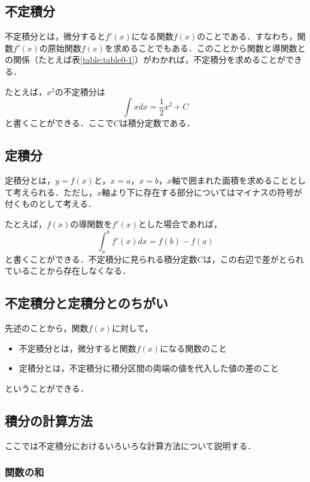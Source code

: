 \subsection{不定積分}

不定積分とは，微分すると$f'(x)$になる関数$f(x)$のことである．すなわち，関数$f'(x)$の原始関数$f(x)$を求めることでもある．このことから関数と導関数との関係（たとえば表\ref{table:table0-1}）がわかれば，不定積分を求めることができる．

たとえば，$x^2$の不定積分は
\begin{equation}
\int x dx = \frac{1}{2}x^2+C
\end{equation}
と書くことができる．ここで$C$は積分定数である．

\subsection{定積分}

定積分とは，$y=f(x)$と，$x=a$，$x=b$，$x$軸で囲まれた面積を求めることとして考えられる．ただし，$x$軸より下に存在する部分についてはマイナスの符号が付くものとして考える．

たとえば，$f(x)$の導関数を$f'(x)$とした場合であれば，
\begin{equation}
\int_{a}^{b}f'(x)dx = f(b)-f(a)
\end{equation}
と書くことができる．不定積分に見られる積分定数$C$は，この右辺で差がとられていることから存在しなくなる．

\subsection{不定積分と定積分とのちがい}

先述のことから，関数$f(x)$に対して，
\begin{itemize}
\item 不定積分とは，微分すると関数$f(x)$になる関数のこと
\item {}定積分とは，不定積分に積分区間の両端の値を代入した値の差のこと
\end{itemize}
ということができる．

\subsection{積分の計算方法}

ここでは不定積分におけるいろいろな計算方法について説明する．

\subsubsection{関数の和}

